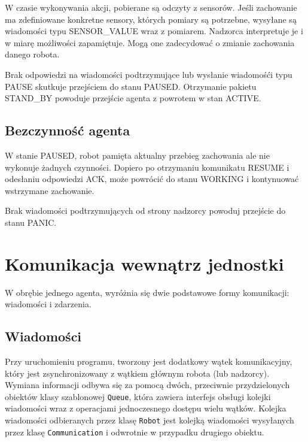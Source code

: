 
W czasie wykonywania akcji, pobierane są odczyty z sensorów. Jeśli zachowanie ma zdefiniowane konkretne sensory, których pomiary są potrzebne, wysyłane są wiadomości typu SENSOR\_VALUE wraz z pomiarem. Nadzorca interpretuje je i w miarę możliwości zapamiętuje. Mogą one zadecydować o zmianie zachowania danego robota.

Brak odpowiedzi na wiadomości podtrzymujące lub wysłanie wiadomośći typu PAUSE skutkuje przejściem do stanu PAUSED. Otrzymanie pakietu STAND\_BY powoduje przejście agenta z powrotem w stan ACTIVE.

\subsection{Bezczynność agenta}

W stanie PAUSED, robot pamięta aktualny przebieg zachowania ale nie wykonuje żadnych czynności. Dopiero po otrzymaniu komunikatu RESUME i odesłaniu odpowiedzi ACK, może powrócić do stanu WORKING i kontynuować wstrzymane zachowanie.

Brak wiadomości podtrzymujących od strony nadzorcy powoduj przejście do stanu PANIC.

\section{Komunikacja wewnątrz jednostki}

W obrębie jednego agenta, wyróżnia się dwie podstawowe formy komunikacji: wiadomości i zdarzenia.

\subsection{Wiadomości}

Przy uruchomieniu programu, tworzony jest dodatkowy wątek komunikacyjny, który jest zsynchronizowany z wątkiem głównym robota (lub nadzorcy). Wymiana informacji odbywa się za pomocą dwóch, przeciwnie przydzielonych obiektów klasy szablonowej {\tt Queue}, która zawiera interfejs obsługi kolejki wiadomości wraz z operacjami jednoczesnego dostępu wielu wątków. Kolejka wiadomości odbieranych przez klasę {\tt Robot} jest kolejką wiadomości wysyłanych przez klasę {\tt Communication} i odwrotnie w przypadku drugiego obiektu.

